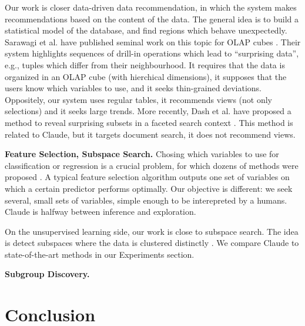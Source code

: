 Our work is closer data-driven data recommendation, in which the system makes
recommendations based on the content of the data. The general idea is to build
a statistical model of the database, and find regions which behave
unexpectedly. Sarawagi et al. have published seminal work on this topic for
OLAP cubes \cite{sarawagi1998discovery}. Their system highlights sequences of
drill-in operations which lead to ``surprising data'', e.g., tuples which
differ from their neighbourhood. It requires that the data is organized in an
OLAP cube (with hierchical dimensions), it supposes that the users know which
variables to use, and it seeks thin-grained deviations. Oppositely, our system
uses regular tables, it recommends views (not only selections) and it seeks
large trends. More recently, Dash et al. have proposed a method to reveal
surprising subsets in a faceted search context \cite{dash2008dynamic}. This
method is related to Claude, but it targets document search, it does not
recommend views.


\textbf{Feature Selection, Subspace Search.} Chosing which variables to use for
classification or regression is a crucial problem, for which dozens of methods
were proposed \cite{guyon2003introduction}. A typical feature selection
algorithm outputs one set of variables on which a certain predictor performs
optimally. Our objective is different: we seek several, small sets of variables,
simple enough to be interepreted by a humans. Claude is halfway between
inference and exploration.

On the unsupervised learning side, our work is close to subspace search. The
idea is detect subspaces where the data is clustered distinctly
\cite{keller2012hics,nguyen20134s}. We compare Claude to state-of-the-art
methods in our Experiments section.

\textbf{Subgroup Discovery.}

\section{Conclusion}
